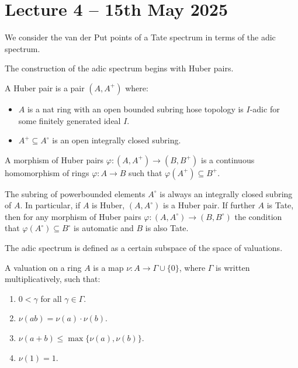 \section{Lecture 4 -- 15th May 2025}\label{sec: lecture 4}
We consider the van der Put points of a Tate spectrum in terms of the adic spectrum. 

The construction of the adic spectrum begins with Huber pairs. 
\begin{definition}\label{def: Huber pair}
    A Huber pair is a pair $(A,A^{+})$ where:
    \begin{itemize}
        \item $A$ is a nat ring with an open bounded subring hose topology is $I$-adic for some finitely generated ideal $I$. 
        \item $A^{+}\subseteq A^{\circ}$ is an open integrally closed subring. 
    \end{itemize}
\end{definition}
\begin{definition}\label{def: morphism of Huber pairs}
    A morphism of Huber pairs $\varphi:(A,A^{+})\to(B,B^{+})$ is a continuous homomorphism of rings $\varphi:A\to B$ such that $\varphi(A^{+})\subseteq B^{+}$. 
\end{definition}
\begin{remark}
    The subring of powerbounded elements $A^{\circ}$ is always an integrally closed subring of $A$. In particular, if $A$ is Huber, $(A,A^{\circ})$ is a Huber pair. If further $A$ is Tate, then for any morphism of Huber pairs $\varphi:(A,A^{\circ})\to (B,B^{\circ})$ the condition that $\varphi(A^{\circ})\subseteq B^{\circ}$ is automatic and $B$ is also Tate. 
\end{remark}
The adic spectrum is defined as a certain subspace of the space of valuations. 
\begin{definition}[Valuation]\label{def: valuation}
    A valuation on a ring $A$ is a map $\nu:A\to\Gamma\cup\{0\}$, where $\Gamma$ is written multiplicatively, such that:
    \begin{enumerate}[label=(\roman*)]
        \item $0<\gamma$ for all $\gamma\in\Gamma$. 
        \item $\nu(ab)=\nu(a)\cdot\nu(b)$. 
        \item $\nu(a+b)\leq\max\{\nu(a),\nu(b)\}$. 
        \item $\nu(1)=1$. 
    \end{enumerate}
\end{definition}
